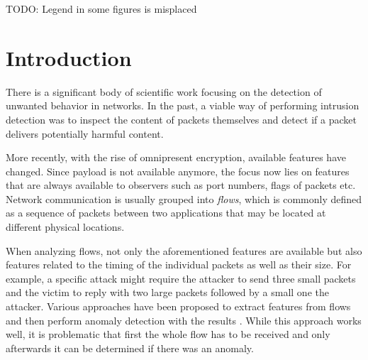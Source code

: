 \documentclass[conference]{IEEEtran}
\newcommand\note[2]{{\color{#1}#2}}
\newcommand\todo[1]{{\note{red}{TODO: #1}}}
\begin{document}

\maketitle

\todo{Legend in some figures is misplaced}

\section{Introduction}

There is a significant body of scientific work focusing on the detection of unwanted behavior in networks. In the past, a viable way of performing intrusion detection was to inspect the content of packets themselves and detect if a packet delivers potentially harmful content.

More recently, with the rise of omnipresent encryption, available features have changed. Since payload is not available anymore, the focus now lies on features that are always available to observers such as port numbers, flags of packets etc. Network communication is usually grouped into \textit{flows}, which is commonly defined as a sequence of packets between two applications that may be located at different physical locations.

When analyzing flows, not only the aforementioned features are available but also features related to the timing of the individual packets as well as their size. For example, a specific attack might require the attacker to send three small packets and the victim to reply with two large packets followed by a small one the attacker. Various approaches have been proposed to extract features from flows and then perform anomaly detection with the results \cite{meghdouri_analysis_2018}. While this approach works well, it is problematic that first the whole flow has to be received and only afterwards it can be determined if there was an anomaly.
\end{document}
